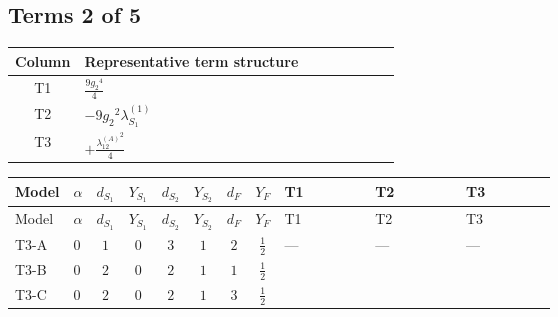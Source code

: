 \documentclass[8pt]{article}
\begin{document}
\begin{landscape}
\subsection*{Terms 2 of 5}
\begin{center}
\begin{tabular}{@{}c >{\raggedright\arraybackslash}p{0.82\linewidth}@{}}
\toprule
Column & Representative term structure \\
\midrule
T1 & \(\displaystyle \frac{9 {g_2}^4}{4}\) \\
\midrule
T2 & \(\displaystyle -9 {g_2}^2 {\lambda_{S_1}^{(1)}}\) \\
\midrule
T3 & \(\displaystyle +\frac{{\lambda_{12}^{(A)}}^2}{4}\) \\
\midrule
\bottomrule
\end{tabular}
\end{center}
\smallskip
\tiny
\begin{longtable}{@{}llcccccc >{\raggedright\arraybackslash}p{0.21\linewidth} >{\raggedright\arraybackslash}p{0.21\linewidth} >{\raggedright\arraybackslash}p{0.21\linewidth}@{}}
\toprule
Model & $\alpha$ & $d_{S_1}$ & $Y_{S_1}$ & $d_{S_2}$ & $Y_{S_2}$ & $d_F$ & $Y_F$ & T1 & T2 & T3 \\
\midrule
\endfirsthead
\toprule
Model & $\alpha$ & $d_{S_1}$ & $Y_{S_1}$ & $d_{S_2}$ & $Y_{S_2}$ & $d_F$ & $Y_F$ & T1 & T2 & T3 \\
\midrule
\endhead
T3-A & $0$ & $1$ & $0$ & $3$ & $1$ & $2$ & $\frac{1}{2}$ & --- & --- & --- \\
\midrule
T3-B & $0$ & $2$ & $0$ & $2$ & $1$ & $1$ & $\frac{1}{2}$ & \scriptsize\adjustbox{max width=\linewidth}{$\begin{gathered} \frac{9 {g_2}^4}{4}\end{gathered}$} & \scriptsize\adjustbox{max width=\linewidth}{$\begin{gathered} -9 {g_2}^2 {\lambda_{S_1}^{(1)}}\end{gathered}$} & \scriptsize\adjustbox{max width=\linewidth}{$\begin{gathered} +\frac{{\lambda_{12}^{(A)}}^2}{4}\end{gathered}$} \\
\midrule
T3-C & $0$ & $2$ & $0$ & $2$ & $1$ & $3$ & $\frac{1}{2}$ & \scriptsize\adjustbox{max width=\linewidth}{$\begin{gathered} \frac{9 {g_2}^4}{4}\end{gathered}$} & \scriptsize\adjustbox{max width=\linewidth}{$\begin{gathered} -9 {g_2}^2 {\lambda_{S_1}^{(1)}}\end{gathered}$} & \scriptsize\adjustbox{max width=\linewidth}{$\begin{gathered} +\frac{{\lambda_{12}^{(A)}}^2}{4}\end{gathered}$} \\

\end{longtable}
\end{landscape}
\end{document}
